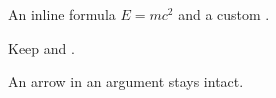An inline formula \(E=mc^2\) and a custom .

Keep  and \citep[see][p.~5]{key}.

An arrow in an argument  stays intact.
